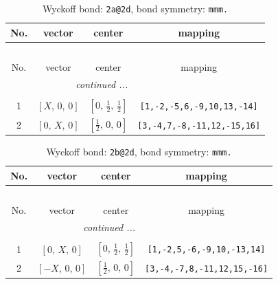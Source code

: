 \documentclass[fleqn,8pt]{jsarticle}
\begin{document}
\begin{longtable}{cccc}
\caption{Wyckoff bond: {\tt 2a@2d}, bond symmetry: {\tt mmm.}}
 \\
 \hline \hline
No. & vector & center & mapping \\ \hline \endfirsthead

\multicolumn{3}{l}{\tablename\ \thetable{}} \\
 \hline \hline
No. & vector & center & mapping \\ \hline \endhead

 \hline \hline
\multicolumn{3}{r}{\footnotesize\it continued ...} \\ \endfoot

 \hline \hline
\multicolumn{3}{r}{} \\ \endlastfoot

1 & $\left[ X,\, 0,\, 0 \right]$ & $\left[ 0,\, \frac{1}{2},\, \frac{1}{2} \right]$ & {\tt [1,-2,-5,6,-9,10,13,-14]} \\ \hline
2 & $\left[ 0,\, X,\, 0 \right]$ & $\left[ \frac{1}{2},\, 0,\, 0 \right]$ & {\tt [3,-4,7,-8,-11,12,-15,16]} \\
\end{longtable}
\renewcommand{\arraystretch}{1.2}
\begin{longtable}{cccc}
\caption{Wyckoff bond: {\tt 2b@2d}, bond symmetry: {\tt mmm.}}
 \\
 \hline \hline
No. & vector & center & mapping \\ \hline \endfirsthead

\multicolumn{3}{l}{\tablename\ \thetable{}} \\
 \hline \hline
No. & vector & center & mapping \\ \hline \endhead

 \hline \hline
\multicolumn{3}{r}{\footnotesize\it continued ...} \\ \endfoot

 \hline \hline
\multicolumn{3}{r}{} \\ \endlastfoot

1 & $\left[ 0,\, X,\, 0 \right]$ & $\left[ 0,\, \frac{1}{2},\, \frac{1}{2} \right]$ & {\tt [1,-2,5,-6,-9,10,-13,14]} \\ \hline
2 & $\left[ - X,\, 0,\, 0 \right]$ & $\left[ \frac{1}{2},\, 0,\, 0 \right]$ & {\tt [3,-4,-7,8,-11,12,15,-16]} \\
\end{longtable}
\renewcommand{\arraystretch}{1.2}
\end{document}

